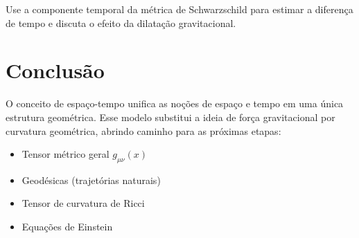 \documentclass[a4paper,12pt]{article}
\begin{document}
Use a componente temporal da métrica de Schwarzschild para estimar a diferença de tempo e discuta o efeito da dilatação gravitacional.

\section*{Conclusão}

O conceito de espaço-tempo unifica as noções de espaço e tempo em uma única estrutura geométrica.  
Esse modelo substitui a ideia de força gravitacional por curvatura geométrica, abrindo caminho para as próximas etapas:
\begin{itemize}
    \item Tensor métrico geral $g_{\mu\nu}(x)$
    \item Geodésicas (trajetórias naturais)
    \item Tensor de curvatura de Ricci
    \item Equações de Einstein
\end{itemize}
\end{document}
